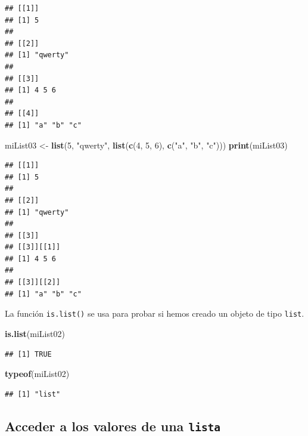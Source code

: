 \documentclass[]{book}
\newenvironment{Shaded}{\begin{snugshade}}{\end{snugshade}}
\newcommand{\KeywordTok}[1]{\textcolor[rgb]{0.13,0.29,0.53}{\textbf{#1}}}
\newcommand{\DecValTok}[1]{\textcolor[rgb]{0.00,0.00,0.81}{#1}}
\newcommand{\StringTok}[1]{\textcolor[rgb]{0.31,0.60,0.02}{#1}}
\newcommand{\NormalTok}[1]{#1}
\begin{document}
\begin{verbatim}
## [[1]]
## [1] 5
## 
## [[2]]
## [1] "qwerty"
## 
## [[3]]
## [1] 4 5 6
## 
## [[4]]
## [1] "a" "b" "c"
\end{verbatim}

\begin{Shaded}
\begin{Highlighting}[]
\NormalTok{miList03 <-}\StringTok{ }\KeywordTok{list}\NormalTok{(}\DecValTok{5}\NormalTok{, }\StringTok{"qwerty"}\NormalTok{, }\KeywordTok{list}\NormalTok{(}\KeywordTok{c}\NormalTok{(}\DecValTok{4}\NormalTok{, }\DecValTok{5}\NormalTok{, }\DecValTok{6}\NormalTok{), }\KeywordTok{c}\NormalTok{(}\StringTok{"a"}\NormalTok{, }\StringTok{"b"}\NormalTok{, }\StringTok{"c"}\NormalTok{)))}
\KeywordTok{print}\NormalTok{(miList03)}
\end{Highlighting}
\end{Shaded}

\begin{verbatim}
## [[1]]
## [1] 5
## 
## [[2]]
## [1] "qwerty"
## 
## [[3]]
## [[3]][[1]]
## [1] 4 5 6
## 
## [[3]][[2]]
## [1] "a" "b" "c"
\end{verbatim}

La función \texttt{is.list()} se usa para probar si hemos creado un
objeto de tipo \texttt{list}.

\begin{Shaded}
\begin{Highlighting}[]
\KeywordTok{is.list}\NormalTok{(miList02)}
\end{Highlighting}
\end{Shaded}

\begin{verbatim}
## [1] TRUE
\end{verbatim}

\begin{Shaded}
\begin{Highlighting}[]
\KeywordTok{typeof}\NormalTok{(miList02)}
\end{Highlighting}
\end{Shaded}

\begin{verbatim}
## [1] "list"
\end{verbatim}

\subsection{\texorpdfstring{Acceder a los valores de una
\texttt{lista}}{Acceder a los valores de una lista}}\label{acceder-a-los-valores-de-una-lista}
\end{document}
